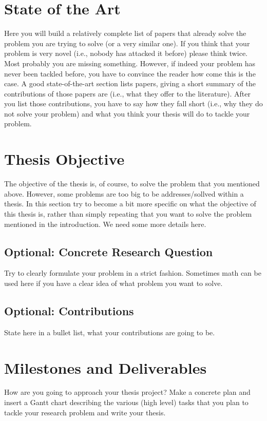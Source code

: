\documentclass[a4paper]{article}
\begin{document}


\section{State of the Art}
Here you will build a relatively complete list of papers that already solve the problem you are trying to solve (or a very similar one). If you think that your problem is very novel (i.e., nobody has attacked it before) please think twice. Most probably you are missing something. However, if indeed your problem has never been tackled before, you have to convince the reader how come this is the case. A good state-of-the-art section lists papers, giving a short summary of the contributions of those papers are (i.e., what they offer to the literature). After you list those contributions, you have to say how they fall short (i.e., why they do not solve your problem) and what you think your thesis will do to tackle your problem.


\section{Thesis Objective}
The objective of the thesis is, of course, to solve the problem that you mentioned above. However, some problems are too big to be addresses/sollved within a thesis. In this section try to become a bit more specific on what the objective of this thesis is, rather than simply repeating that you want to solve the problem mentioned in the introduction. We need some more details here.

\subsection{Optional: Concrete Research Question}
Try to clearly formulate your problem in a strict fashion. Sometimes math can be used here if you have a clear idea of what problem you want to solve. 

\subsection{Optional: Contributions}
State here in a bullet list, what your contributions are going to be. 

\section{Milestones and Deliverables}
How are you going to approach your thesis project? Make a concrete plan and insert a Gantt chart describing the various (high level) tasks that you plan to tackle your research problem and write your thesis. 


\printbibliography
\end{document}
